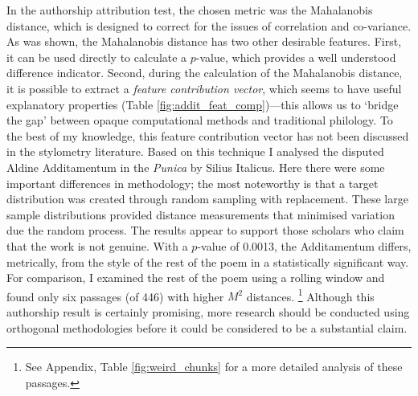 \documentclass[11pt,a4paper]{scrartcl} %
\begin{document}
{In the authorship attribution test, the chosen metric was the Mahalanobis distance, which is designed to correct for the issues of correlation and co-variance. As was shown, the Mahalanobis distance has two other desirable features. First, it can be used directly to calculate a $p$-value, which provides a well understood difference indicator. Second, during the calculation of the Mahalanobis distance, it is possible to extract a \textit{feature contribution vector}, which seems to have useful explanatory properties (Table \ref{fig:addit_feat_comp})---this allows us to `bridge the gap' between opaque computational methods and traditional philology. To the best of my knowledge, this feature contribution vector has not been discussed in the stylometry literature. Based on this technique I analysed the disputed Aldine Additamentum in the \textit{Punica} by Silius Italicus. Here there were some important differences in methodology; the most noteworthy is that a target distribution was created through random sampling with replacement. These large sample distributions provided distance measurements that minimised variation due the random process. The results appear to support those scholars who claim that the work is not genuine. With a $p$-value of 0.0013, the Additamentum differs, metrically, from the style of the rest of the poem in a statistically significant way. For comparison, I examined the rest of the poem using a rolling window and found only six passages (of 446) with higher $M^{2}$ distances.%
\footnote{See Appendix, Table \ref{fig:weird_chunks} for a more detailed analysis of these passages.}
Although this authorship result is certainly promising, more research should be conducted using orthogonal methodologies before it could be considered to be a substantial claim.
\newpage


\newpage
}
\end{document}
